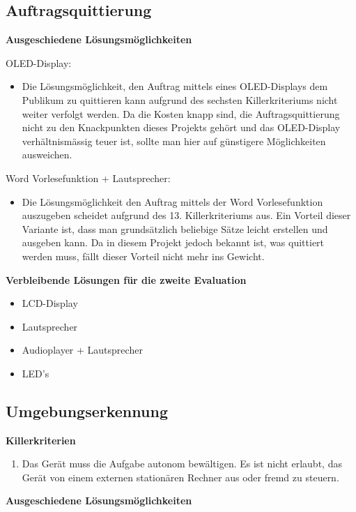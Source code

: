 \newpage
\subsection{Auftragsquittierung}

\textbf{Ausgeschiedene Lösungsmöglichkeiten} 

OLED-Display:
\begin{itemize}
    \item Die Lösungsmöglichkeit, den Auftrag mittels eines OLED-Displays dem Publikum zu quittieren kann aufgrund des sechsten Killerkriteriums nicht weiter verfolgt werden. Da die Kosten knapp sind, die Auftragsquittierung nicht zu den Knackpunkten dieses Projekts gehört und das OLED-Display verhältnismässig teuer ist, sollte man hier auf günstigere Möglichkeiten ausweichen.
\end{itemize}

Word Vorlesefunktion + Lautsprecher:
\begin{itemize}
    \item Die Lösungsmöglichkeit den Auftrag mittels der Word Vorlesefunktion auszugeben scheidet aufgrund des 13. Killerkriteriums aus. Ein Vorteil dieser Variante ist, dass man grundsätzlich beliebige Sätze leicht erstellen und ausgeben kann. Da in diesem Projekt jedoch bekannt ist, was quittiert werden muss, fällt dieser Vorteil nicht mehr ins Gewicht.
\end{itemize}

\textbf{Verbleibende Lösungen für die zweite Evaluation}
\begin{itemize}
    \item LCD-Display
    \item Lautsprecher
    \item Audioplayer + Lautsprecher
    \item LED's
\end{itemize}

\subsection{Umgebungserkennung}
\textbf{Killerkriterien}
\begin{enumerate} 
    \item Das Gerät muss die Aufgabe autonom bewältigen. Es ist nicht erlaubt, das Gerät von einem externen stationären Rechner aus oder fremd zu steuern.
\end{enumerate}

\textbf{Ausgeschiedene Lösungsmöglichkeiten}

